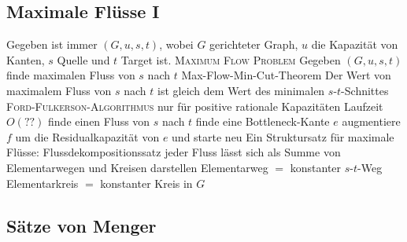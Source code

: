 \subsection{Maximale Flüsse I}
\begin{outline}
\0 Gegeben ist immer $(G,u,s,t)$, wobei $G$ gerichteter Graph, $u$ die Kapazität von Kanten, $s$ Quelle und $t$ Target ist. 
    \1 \textsc{Maximum Flow Problem}
        \2 Gegeben $(G,u,s,t)$ finde maximalen Fluss von $s$ nach $t$
    \1 Max-Flow-Min-Cut-Theorem
        \2 Der Wert von maximalem Fluss von $s$ nach $t$ ist gleich dem Wert des minimalen $s$-$t$-Schnittes
    \1 \textsc{Ford-Fulkerson-Algorithmus}
        \2 nur für positive rationale Kapazitäten
        \2 Laufzeit $O(??)$
            \3 finde einen Fluss von $s$ nach $t$
            \3 finde eine Bottleneck-Kante $e$
            \3 augmentiere $f$ um die Residualkapazität von $e$ und starte neu
\0 Ein Struktursatz für maximale Flüsse:
    \1 Flussdekompositionssatz
        \2 jeder Fluss lässt sich als Summe von Elementarwegen und Kreisen darstellen
            \3 Elementarweg $=$ konstanter $s$-$t$-Weg
            \3 Elementarkreis $=$ konstanter Kreis in $G$
\end{outline}

\subsection{Sätze von Menger}

